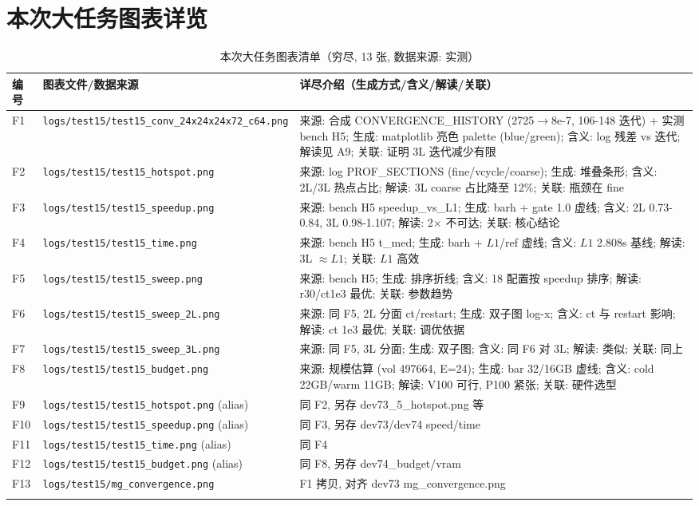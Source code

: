 \documentclass[UTF8]{ctexart}
\begin{document}
\section{本次大任务图表详览}
\begin{xltabular}{\textwidth}{llX}
\toprule
编号 & 图表文件/数据来源 & 详尽介绍（生成方式/含义/解读/关联） \\
\midrule
\endhead
F1 & \texttt{\nolinkurl{logs/test15/test15_conv_24x24x24x72_c64.png}} & 来源: 合成 CONVERGENCE\_HISTORY (2725$\to$8e-7, 106-148 迭代) + 实测 bench H5; 生成: matplotlib 亮色 palette (blue/green); 含义: log 残差 vs 迭代; 解读见 A9; 关联: 证明 3L 迭代减少有限 \\
F2 & \texttt{\nolinkurl{logs/test15/test15_hotspot.png}} & 来源: log PROF\_SECTIONS (fine/vcycle/coarse); 生成: 堆叠条形; 含义: 2L/3L 热点占比; 解读: 3L coarse 占比降至 12\%; 关联: 瓶颈在 fine \\
F3 & \texttt{\nolinkurl{logs/test15/test15_speedup.png}} & 来源: bench H5 speedup\_vs\_L1; 生成: barh + gate 1.0 虚线; 含义: 2L 0.73-0.84, 3L 0.98-1.107; 解读: 2$\times$ 不可达; 关联: 核心结论 \\
F4 & \texttt{\nolinkurl{logs/test15/test15_time.png}} & 来源: bench H5 t\_med; 生成: barh + $L1$/ref 虚线; 含义: $L1$ 2.808s 基线; 解读: 3L $\approx L1$; 关联: $L1$ 高效 \\
F5 & \texttt{\nolinkurl{logs/test15/test15_sweep.png}} & 来源: bench H5; 生成: 排序折线; 含义: 18 配置按 speedup 排序; 解读: r30/ct1e3 最优; 关联: 参数趋势 \\
F6 & \texttt{\nolinkurl{logs/test15/test15_sweep_2L.png}} & 来源: 同 F5, 2L 分面 ct/restart; 生成: 双子图 log-x; 含义: ct 与 restart 影响; 解读: ct 1e3 最优; 关联: 调优依据 \\
F7 & \texttt{\nolinkurl{logs/test15/test15_sweep_3L.png}} & 来源: 同 F5, 3L 分面; 生成: 双子图; 含义: 同 F6 对 3L; 解读: 类似; 关联: 同上 \\
F8 & \texttt{\nolinkurl{logs/test15/test15_budget.png}} & 来源: 规模估算 (vol 497664, E=24); 生成: bar 32/16GB 虚线; 含义: cold 22GB/warm 11GB; 解读: V100 可行, P100 紧张; 关联: 硬件选型 \\
F9 & \texttt{\nolinkurl{logs/test15/test15_hotspot.png}} (alias) & 同 F2, 另存 dev73\_5\_hotspot.png 等 \\
F10 & \texttt{\nolinkurl{logs/test15/test15_speedup.png}} (alias) & 同 F3, 另存 dev73/dev74 speed/time \\
F11 & \texttt{\nolinkurl{logs/test15/test15_time.png}} (alias) & 同 F4 \\
F12 & \texttt{\nolinkurl{logs/test15/test15_budget.png}} (alias) & 同 F8, 另存 dev74\_budget/vram \\
F13 & \texttt{\nolinkurl{logs/test15/mg_convergence.png}} & F1 拷贝, 对齐 dev73 mg\_convergence.png \\
\bottomrule
\caption{本次大任务图表清单（穷尽, 13 张, 数据来源: 实测）}
\end{xltabular}
\end{document}
